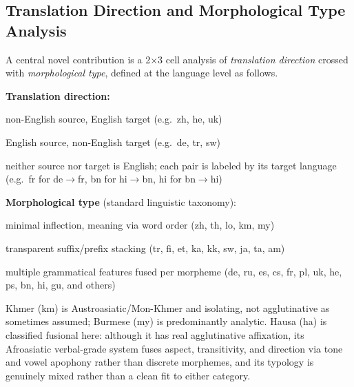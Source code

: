 \documentclass[11pt]{article}
\begin{document}
\subsection{Translation Direction and Morphological Type Analysis}
\label{sec:dir_morph}

A central novel contribution is a 2$\times$3 cell analysis of \emph{translation direction} crossed with \emph{morphological type}, defined at the language level as follows.

\vspace{0.3em}
\noindent\textbf{Translation direction:}
\begin{description}[noitemsep,topsep=2pt]
  \item[X$\to$en] non-English source, English target (e.g.\ zh, he, uk)
  \item[en$\to$X] English source, non-English target (e.g.\ de, tr, sw)
  \item[X$\leftrightarrow$Y] neither source nor target is English; each pair is labeled by its target language (e.g.\ fr for de$\to$fr, bn for hi$\to$bn, hi for bn$\to$hi)
\end{description}
\vspace{0.3em}
\noindent\textbf{Morphological type} (standard linguistic taxonomy):
\begin{description}[noitemsep,topsep=2pt]
  \item[isolating] minimal inflection, meaning via word order (zh, th, lo, km, my)
  \item[agglutinative] transparent suffix/prefix stacking (tr, fi, et, ka, kk, sw, ja, ta, am)
  \item[fusional] multiple grammatical features fused per morpheme (de, ru, es, cs, fr, pl, uk, he, ps, bn, hi, gu, and others)
\end{description}
\vspace{0.3em}

Khmer (km) is Austroasiatic/Mon-Khmer and isolating, not agglutinative as sometimes assumed; Burmese (my) is predominantly analytic. Hausa (ha) is classified fusional here: although it has real agglutinative affixation, its Afroasiatic verbal-grade system fuses aspect, transitivity, and direction via tone and vowel apophony rather than discrete morphemes, and its typology is genuinely mixed rather than a clean fit to either category.
\end{document}
